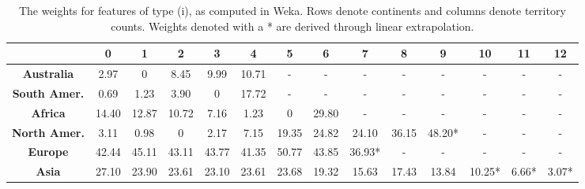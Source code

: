 \documentclass[letterpaper]{article}
\numberwithin{equation}{section}
\numberwithin{theorem}{section}
\numberwithin{lemma}{section}
\numberwithin{df}{section}
\begin{document}
\begin{table}[t]
 \centering
      \caption{The weights for features of type (i), as computed in Weka.  Rows denote continents and columns denote territory counts.  Weights denoted with a * are derived through linear extrapolation.}
    \label{tab:ContScoring}
    \begin{footnotesize}
    \begin{tabular}{|c|c|c|c|c|c|c|c|c|c|c|c|c|c|}
    	\hline
    	  & \bf 0 & \bf 1 & \bf 2  & \bf 3 & \bf 4 & \bf 5 & \bf 6 & \bf 7 & \bf 8 & \bf 9 & \bf 10 & \bf 11 & \bf 12 \\
    	 \hline
    	\bf Australia & 2.97 & 0 & 8.45 & 9.99 & 10.71 & - & - & - & - & - & - & - & - \\
    	\hline
    	\bf South Amer. & 0.69 & 1.23 & 3.90 & 0 & 17.72 & - & - & - & - & - & - & - & - \\
    	\hline
    	\bf Africa & 14.40 & 12.87 & 10.72 & 7.16 & 1.23 & 0 & 29.80 & - & - & - & - & - & - \\
    	\hline
    	\bf North Amer. & 3.11 & 0.98 & 0 & 2.17 & 7.15 & 19.35 & 24.82 & 24.10 & 36.15 & 48.20* & - & - & - \\
    	\hline
    	\bf Europe & 42.44 & 45.11 & 43.11 & 43.77 & 41.35 & 50.77 & 43.85 & 36.93* & - & - & - & - & - \\
    	\hline
    	\bf Asia & 27.10 & 23.90 & 23.61 & 23.10 & 23.61 & 23.68 & 19.32 & 15.63 & 17.43 & 13.84 & 10.25* & 6.66* & 3.07* \\
    	\hline
    \end{tabular}
    \end{footnotesize}
\end{table}
\end{document}
